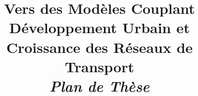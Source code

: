 




\title{Vers des Modèles Couplant Développement Urbain et Croissance des Réseaux de Transport\bigskip\\
\textit{Plan de Thèse}
}
\author{}


\maketitle

\justify


\begin{abstract}
\end{abstract}


%
%
%
%
%
%
%
%
%
%
%
%
%
%
%
%
